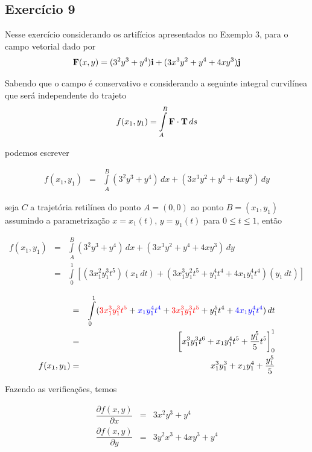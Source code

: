 \documentclass[a4paper, 12pt, brazilian]{article}
\begin{document}
	\subsection{Exercício 9}
	
	Nesse exercício considerando os artifícios apresentados no Exemplo 3, para o campo vetorial dado por
	\begin{equation}
		\textbf{F} (x,y)=(3^{2}y^{3}+y^{4})\textbf{i}+(3x^{3}y^{2}+y^{4}+4xy^{3})\textbf{j}
	\end{equation}
	
	Sabendo que o campo é conservativo e considerando a seguinte integral curvilínea que será independente do trajeto
	\begin{equation}
		f(x_{1},y_{1})=\int\limits_{A}^{B}\textbf{F}\cdot\textbf{T}\,ds
	\end{equation}
	
	podemos escrever
	
	\begin{eqnarray}
		f(x_{1},y_{1})&=&\int\limits_{A}^{B}(3^{2}y^{3}+y^{4})\,dx+(3x^{3}y^{2}+y^{4}+4xy^{3})\,dy
	\end{eqnarray}
	
	seja $C$ a trajetória retilínea do ponto $A=(0,0)$ ao ponto $B=(x_{1},y_{1})$ assumindo a parametrização $x=x_{1}(t)$, $y=y_{1}(t)$ para $0\leq t\leq 1$, então
	
	\begin{eqnarray}
	f(x_{1},y_{1})&=&\int\limits_{A}^{B}(3^{2}y^{3}+y^{4})\,dx+(3x^{3}y^{2}+y^{4}+4xy^{3})\,dy\\
	&=&\int\limits_{0}^{1}[(3x_{1}^{2}y_{1}^{3}t^{5})(x_{1}\,dt)+(3x_{1}^{3}y_{1}^{2}t^{5}+y_{1}^{4}t^{4}+4x_{1}y_{1}^{4}t^{4})(y_{1}\,dt)]
	\end{eqnarray}
	
	\begin{eqnarray}
		&=&\int\limits_{0}^{1}(\textcolor{red}{3x_{1}^{3}y_{1}^{3}t^{5}}+\textcolor{blue}{x_{1}y_{1}^{4}t^{4}}+\textcolor{red}{3x_{1}^{3}y_{1}^{3}t^{5}}+y_{1}^{5}t^{4}+\textcolor{blue}{4x_{1}y_{1}^{4}t^{4}})\,dt\\
		&=&\left[x_{1}^{3}y_{1}^{3}t^{6}+x_{1}y_{1}^{4}t^{5}+\dfrac{y_{1}^{5}}{5}t^{5}\right]_{0}^{1}\\
		f(x_{1},y_{1})&=&x_{1}^{3}y_{1}^{3}+x_{1}y_{1}^{4}+\dfrac{y_{1}^{5}}{5}
	\end{eqnarray}
	
	Fazendo as verificações, temos
	
	\begin{eqnarray}
		\dfrac{\partial f(x,y)}{\partial x}&=&3x^{2}y^{3}+y^{4}\\
		\dfrac{\partial f(x,y)}{\partial y}&=&3y^{2}x^{3}+4xy^{3}+y^{4}
	\end{eqnarray}
	
\end{document}
